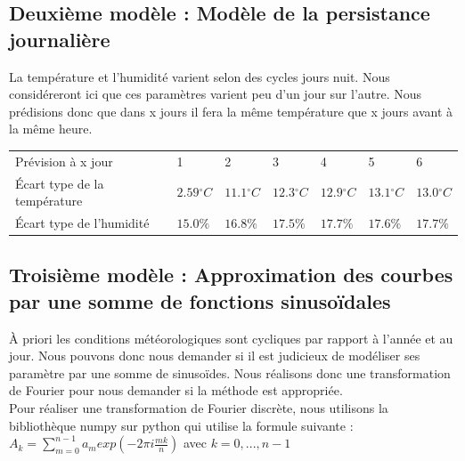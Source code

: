 \documentclass[11pt,a4paper]{article}
\begin{document}

\subsection{Deuxième modèle : Modèle de la persistance journalière}
 La température et l'humidité varient selon des cycles jours nuit. Nous considéreront ici que ces paramètres varient peu d'un jour sur l'autre. Nous prédisions donc que dans x jours il fera la même température que x jours avant à la même heure. \\
 
\begin{tabular}{lllllll}\hline
\hline
Prévision à x jour                  &1                         &2                         &3                           &4                         &5                          &6 \\
Écart type de la température& $2.59{}^{\circ}C$& $11.1{}^{\circ}C$& $12.3{}^{\circ}C$& $12.9{}^{\circ}C$& $13.1{}^{\circ}C$& $13.0{}^{\circ}C$\\
Écart type de l'humidité       &  $ 15.0\% $         &  $ 16.8\% $         &  $ 17.5\% $        &  $ 17.7\% $         &  $ 17.6\% $         &  $ 17.7\% $\\
\hline 
\end{tabular}


\subsection{Troisième modèle : Approximation des courbes par une somme de fonctions sinusoïdales}
À priori les conditions météorologiques sont cycliques par rapport à l'année et au jour. Nous pouvons donc nous demander si il est judicieux de modéliser ses paramètre par une somme de sinusoïdes. Nous réalisons donc une
transformation de Fourier pour nous demander si la méthode est appropriée. \\
Pour réaliser une transformation de Fourier discrète, nous utilisons la bibliothèque numpy sur python qui utilise la formule suivante :  \\

$ A_{k}  = \displaystyle { \sum_{m=0}^{n-1}} a_{m} exp(-2\pi i \frac{mk}{n} ) $ avec $k = 0, ... , n-1 $   \\ 
\end{document}
